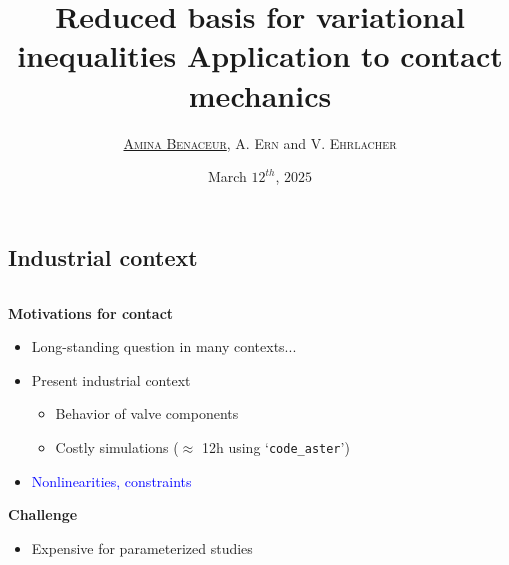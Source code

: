 \documentclass[a4paper,10pt]{beamer}
\title[A RBM for variational inequalities]
{Reduced basis for variational inequalities Application to contact mechanics}
\author[Amina Benaceur]{
\underline{\rmfamily\textsc{Amina Benaceur}}, {\rmfamily\textsc{A. Ern}}
and {\rmfamily\textsc{V. Ehrlacher}}
}
\institute{
{\color{white}me} \\

}
\date{March $12^{th}$, $2025$}
\newcommand\bl[1]{\textcolor{blue} {#1} }
\begin{document}
\begin{frame}%
\vfill
\vfill
\vfill
\titlepage
\end{frame}
 \expandafter\def\expandafter\insertshorttitle\expandafter{%
 \insertshorttitle\hfill
  \insertframenumber/29}
\subsection{Industrial context}


\begin{frame}
\addtocounter{framenumber}{-1}
\begin{columns}
\hspace{0.5cm}
\begin{column}{9cm}
{\bfseries Motivations for contact}
\begin{itemize}
 \item Long-standing question in many contexts...
 \item Present industrial context
  \begin{itemize} 
\item Behavior of valve components
\item Costly simulations ($\approx$ 12h using `\texttt{code\_aster}')
\end{itemize}
\item \bl{Nonlinearities, constraints}
\end{itemize}
\medskip

{\bfseries Challenge}
\begin{itemize} 
\item Expensive for parameterized studies
\end{itemize}
\medskip


\end{column}
\end{columns}
\end{frame}
\end{document}
